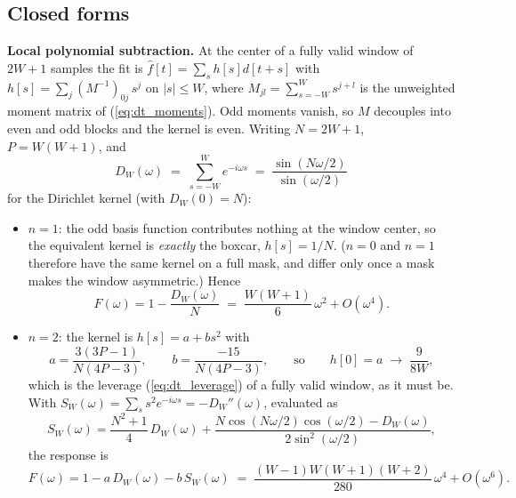 \documentclass{article}
\numberwithin{equation}{section}   %
\begin{document}
\subsection{Closed forms}
\label{sec:ar_formulas}

{\bf Local polynomial subtraction.}  At the center of a fully valid window of $2W+1$ samples the fit is
$\hat f[t] = \sum_s h[s] d[t+s]$ with $h[s] = \sum_j (M^{-1})_{0j}\,s^j$ on $|s| \le W$, where
$M_{jl} = \sum_{s=-W}^{W} s^{j+l}$ is the unweighted moment matrix of (\ref{eq:dt_moments}).  Odd moments
vanish, so $M$ decouples into even and odd blocks and the kernel is even.  Writing $N = 2W+1$,
$P = W(W+1)$, and
\begin{equation}
D_W(\omega) \;=\; \sum_{s=-W}^{W} e^{-i\omega s} \;=\; \frac{\sin(N\omega/2)}{\sin(\omega/2)}
\end{equation}
for the Dirichlet kernel (with $D_W(0) = N$):

\begin{itemize}
\item $n = 1$: the odd basis function contributes nothing at the window center, so the equivalent kernel is
{\em exactly} the boxcar, $h[s] = 1/N$.  ($n=0$ and $n=1$ therefore have the same kernel on a full mask, and
differ only once a mask makes the window asymmetric.)  Hence
\begin{equation}
F(\omega) = 1 - \frac{D_W(\omega)}{N}
\;=\; \frac{W(W+1)}{6}\,\omega^2 + O(\omega^4) .
\label{eq:ar_lps1}
\end{equation}

\item $n = 2$: the kernel is $h[s] = a + b s^2$ with
\begin{equation}
a = \frac{3(3P-1)}{N(4P-3)}, \qquad b = \frac{-15}{N(4P-3)},
\qquad\text{so}\qquad
h[0] = a \;\rightarrow\; \frac{9}{8W} ,
\end{equation}
which is the leverage (\ref{eq:dt_leverage}) of a fully valid window, as it must be.  With
$S_W(\omega) = \sum_s s^2 e^{-i\omega s} = -D_W''(\omega)$, evaluated as
\begin{equation}
S_W(\omega) = \frac{N^2+1}{4}\,D_W(\omega)
   + \frac{N\cos(N\omega/2)\cos(\omega/2) - D_W(\omega)}{2\sin^2(\omega/2)} ,
\end{equation}
the response is
\begin{equation}
F(\omega) = 1 - a\,D_W(\omega) - b\,S_W(\omega)
\;=\; \frac{(W-1)W(W+1)(W+2)}{280}\,\omega^4 + O(\omega^6) .
\label{eq:ar_lps2}
\end{equation}
\end{itemize}
\end{document}
